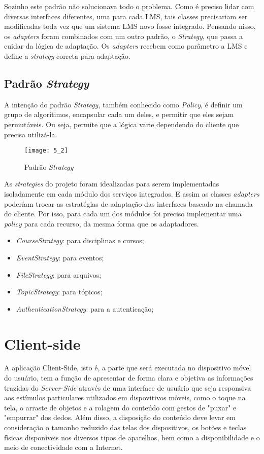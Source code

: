 Sozinho este padrão não solucionava todo o problema. Como é preciso lidar com diversas interfaces diferentes, uma para cada LMS, tais classes precisariam ser modificadas toda vez que um sistema LMS novo fosse integrado. Pensando nisso, os \textit{adapters} foram combinados com um outro padrão, o \textit{Strategy}, que passa a cuidar da lógica de adaptação. Os \textit{adapters} recebem como parâmetro a LMS e define a \textit{strategy} correta para adaptação.

\subsection{Padrão \textit{Strategy}}

A intenção do padrão \textit{Strategy}, também conhecido como \textit{Policy}, é definir um grupo de algorítimos, encapsular cada um deles, e permitir que eles sejam permutáveis. Ou seja, permite que a lógica varie dependendo do cliente que precisa utilizá-la.	

\begin{figure}[H]
    \centering
\texttt{[image: 5\_2]}
    \caption{Padrão \textit{Strategy}}
    \label{figura2}
\end{figure}

As \textit{strategies} do projeto foram idealizadas para serem implementadas isoladamente em cada módulo dos serviços integrados. E assim as classes \textit{adapters} poderíam trocar as estratégias de adaptação das interfaces baseado na chamada do cliente. Por isso, para cada um dos módulos foi preciso implementar uma \textit{policy} para cada recurso, da mesma forma que os adaptadores.

\begin{itemize}
    \item \textit{CourseStrategy}: para disciplinas e cursos;
    \item \textit{EventStrategy}: para eventos;
    \item \textit{FileStrategy}: para arquivos;
    \item \textit{TopicStrategy}: para tópicos;
    \item \textit{AuthenticationStrategy}: para a autenticação;
\end{itemize}


\section{Client-side}
\label{sec:client-side}
A aplicação Client-Side, isto é, a parte que será executada no dispositivo móvel do usuário, tem a função de apresentar de forma clara e objetiva as informações trazidas do \textit{Server-Side} através de uma interface de usuário que seja responsiva aos estímulos particulares utilizados em dispovitivos móveis, como o toque na tela, o arraste de objetos e a rolagem do conteúdo com gestos de "puxar" e "empurrar" dos dedos.  Além disso, a disposição do conteúdo deve levar em consideração o tamanho reduzido das telas dos dispositivos, os botões e teclas físicas disponíveis nos diversos tipos de aparelhos, bem como a disponibilidade e o meio de conectividade com a Internet.

